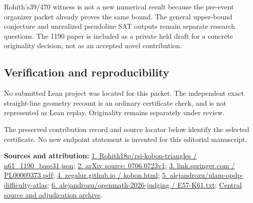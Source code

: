 \documentclass[11pt,a4paper]{article}
\begin{document}
Rohith's39/470 witness is not a new numerical result because the pre-event organizer packet already proves the same bound. The general upper-bound conjecture and unrealized pseudoline SAT outputs remain separate research questions. The 1190 paper is included as a private held draft for a concrete originality decision, not as an accepted novel contribution.

\subsection{Verification and reproducibility}
No submitted Lean project was located for this packet. The independent exact straight-line geometry recount is an ordinary certificate check, and is not represented as Lean replay. Originality remains separately under review.

The preserved contribution record and source locator below identify the selected certificate. No new endpoint statement is invented for this editorial manuscript.

{\small\textbf{Sources and attribution:} \href{https://github.com/Rohith18p/rsi-kobon-triangles/blob/f462d8e18aea2a458376c523c9b6c2980237071f/kobon-triangles/bases/n61_1190_base31.json}{1. Rohith18p/rsi-kobon-triangles / n61\_1190\_base31.json}; \href{https://arxiv.org/html/0706.0723v1}{2. arXiv source: 0706.0723v1}; \href{https://link.springer.com/content/pdf/10.1007/PL00009373.pdf}{3. link.springer.com / PL00009373.pdf}; \href{https://zegalur.github.io/line-order/gallery/kobon.html}{4. zegalur.github.io / kobon.html}; \href{https://github.com/alejandrozu/ulam-opdp-difficulty-atlas}{5. alejandrozu/ulam-opdp-difficulty-atlas}; \href{https://github.com/alejandrozu/openmath-2026-judging/blob/d0ed487f487fa7ec814ff705ab55249983fe8707/OpenMath-Judging/review/entries/E57-K61.txt}{6. alejandrozu/openmath-2026-judging / E57-K61.txt}; \href{https://github.com/alejandrozu/openmath-2026-judging}{Central source and adjudication archive}.\par}
\end{document}
